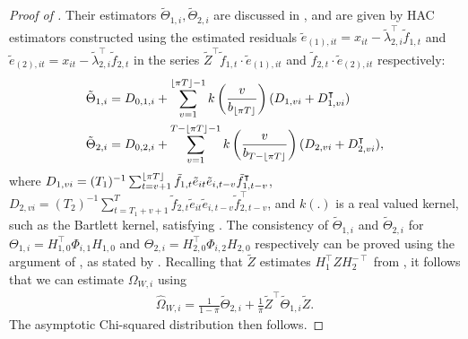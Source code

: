 \documentclass[12pt]{article}
\newcommand*{\tran}{\intercal}
\theoremstyle{plain}
\numberwithin{equation}{section}
\begin{document}
\begin{proof}[Proof of ]
Their estimators $\tilde{\Theta}_{1, i}, \tilde{\Theta}_{2, i}$ are discussed in \textcite{bai_inferential_2003}, and are given by HAC estimators constructed using the estimated residuals $\tilde{e}_{(1), it} = x_{it} - \tilde{\lambda}_{2, i}^\tran \tilde{f}_{1, t}$ and $\tilde{e}_{(2), it} = x_{it} - \tilde{\lambda}_{2, i}^\tran \tilde{f}_{2, t}$ in the series $\tilde{Z}^\tran \tilde{f}_{1, t} \cdot \tilde{e}_{(1), it}$ and $\tilde{f}_{2, t} \cdot \tilde{e}_{(2), it}$ respectively:
\begin{align}
\tilde{\Theta}_{1, i} &= 
D_{0, 1, i} + \sum_{v = 1}^{\floor{\pi T} - 1} k\left( \frac{v}{b_{\floor{\pi T}}} \right) (D_{1, vi} + D_{1, vi}^\tran) \\
\tilde{\Theta}_{2, i} &= 
D_{0, 2, i} + \sum_{v = 1}^{T - \floor{\pi T} - 1} k\left( \frac{v}{b_{T - \floor{\pi T}}} \right) (D_{2, vi} + D_{2, vi}^\tran),
\end{align}
where $D_{1, vi} = (T_1)^{-1} \sum_{t = v + 1}^{\floor{\pi T}} \tilde{f}_{1, t} \tilde{e}_{it} \tilde{e}_{i, t - v} \tilde{f}_{1, t - v}^\tran$, $D_{2, vi} = (T_2)^{-1} \sum_{t = T_1 + v + 1}^{T} \tilde{f}_{2, t} \tilde{e}_{it} \tilde{e}_{i, t - v} \tilde{f}_{2, t - v}^\tran$, and $k(.)$ is a real valued kernel, such as the Bartlett kernel, satisfying .
The consistency of $\tilde{\Theta}_{1, i}$ and $\tilde{\Theta}_{2, i}$ for $\Theta_{1, i} = H_{1, 0}^\tran \Phi_{i, 1} H_{1, 0}$ and $\Theta_{2, i} = H_{2, 0}^\tran \Phi_{i, 2} H_{2, 0}$ respectively can be proved using the argument of \textcite{newey_simple_1987}, as stated by \textcite{bai_inferential_2003}.
Recalling that $\tilde{Z}$ estimates $H_1^\tran Z H_2^{-\tran}$ from , it follows that we can estimate $\Omega_{W, i}$ using
\begin{align*}
\widehat{\Omega}_{W, i} = \frac{1}{1 - \pi}\tilde{\Theta}_{2, i} + \frac{1}{\pi} \tilde{Z}^\tran \tilde{\Theta}_{1, i} \tilde{Z}.
\end{align*}
The asymptotic Chi-squared distribution then follows. 
\end{proof}
\end{document}
